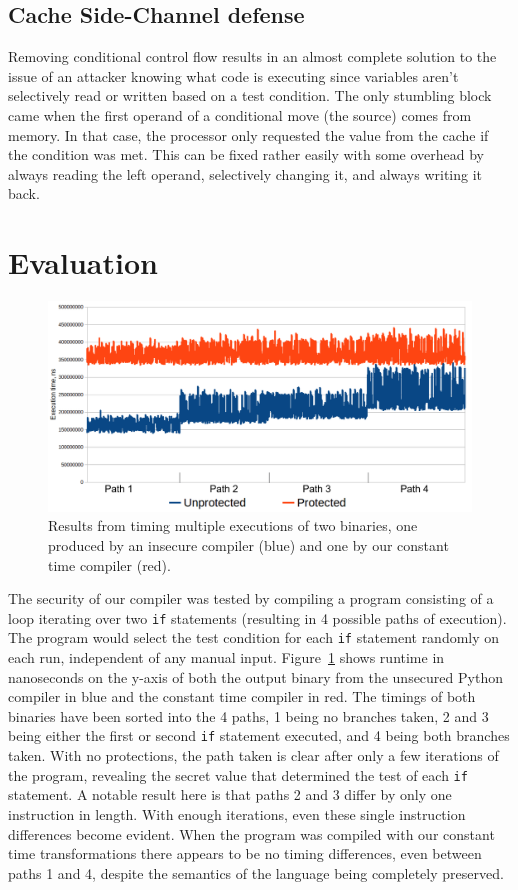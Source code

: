\documentclass[sigplan, review]{acmart}
\begin{document}
\subsection{Cache Side-Channel defense}
Removing conditional control flow results in an almost complete solution to the issue of an attacker knowing what code is executing since variables aren't selectively read or written based on a test condition. The only stumbling block came when the first operand of a conditional move (the source) comes from memory. In that case, the processor only requested the value from the cache if the condition was met. This can be fixed rather easily with some overhead by always reading the left operand, selectively changing it, and always writing it back.

\section{Evaluation}

\begin{figure}[tp]
\includegraphics[width=\textwidth]{./timings_protected_vs_unprotected.png}
\caption{Results from timing multiple executions of two binaries, one produced by an insecure compiler (blue) and one by our constant time compiler (red).}
\label{fig:timings}
\end{figure}

The security of our compiler was tested by compiling a program consisting of a loop iterating over two \texttt{if} statements (resulting in 4 possible paths of execution). The program would select the test condition for each \texttt{if} statement randomly on each run, independent of any manual input. Figure~\ref{fig:timings} shows runtime in nanoseconds on the y-axis of both the output binary from the unsecured Python compiler in blue and the constant time compiler in red. The timings of both binaries have been sorted into the 4 paths, 1 being no branches taken, 2 and 3 being either the first or second \texttt{if} statement executed, and 4 being both branches taken. With no protections, the path taken is clear after only a few iterations of the program, revealing the secret value that determined the test of each \texttt{if} statement. A notable result here is that paths 2 and 3 differ by only one instruction in length. With enough iterations, even these single instruction differences become evident. When the program was compiled with our constant time transformations there appears to be no timing differences, even between paths 1 and 4, despite the semantics of the language being completely preserved.
\end{document}
